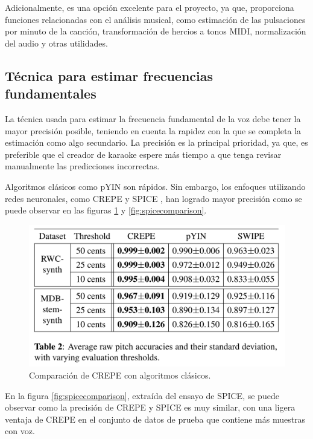 Adicionalmente, es una opción excelente para el proyecto, ya que, proporciona funciones relacionadas con el análisis musical, como estimación de las pulsaciones por minuto de la canción, transformación de hercios a tonos MIDI, normalización del audio y otras utilidades.

\subsection{Técnica para estimar frecuencias fundamentales}

La técnica usada para estimar la frecuencia fundamental de la voz debe tener la mayor precisión posible, teniendo en cuenta la rapidez con la que se completa la estimación como algo secundario. La precisión es la principal prioridad, ya que, es preferible que el creador de karaoke espere más tiempo a que tenga revisar manualmente las predicciones incorrectas.

Algoritmos clásicos como pYIN \cite{pYIN} son rápidos. Sin embargo, los enfoques utilizando redes neuronales, como CREPE \cite{CREPE} y SPICE \cite{SPICE}, han logrado mayor precisión como se puede observar en las figuras \ref{fig:crepecomparison} y \ref{fig:spicecomparison}.

\begin{figure}[h!]
	\centering
	\includegraphics[width=0.7\linewidth]{logos/crepe_comparison}
	\caption{Comparación de CREPE con algoritmos clásicos\protect\footnotemark.}
	\label{fig:crepecomparison}
\end{figure}


En la figura \ref{fig:spicecomparison}, extraída del ensayo de SPICE, se puede observar como la precisión de CREPE y SPICE es muy similar, con una ligera ventaja de CREPE en el conjunto de datos de prueba que contiene más muestras con voz.

